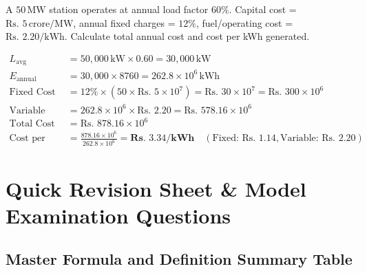 \documentclass[11pt,a4paper]{article}
\newenvironment{Problem}[1][Numerical Problem]{\begin{tcolorbox}[problembox, title=#1]}{\end{tcolorbox}}
\newenvironment{Solution}[1][Step-by-Step Solution]{\begin{tcolorbox}[solbox, title=#1]}{\end{tcolorbox}}
\begin{document}
\begin{Problem}[Problem 12: Generation Tariff Economics]
A $50\,\text{MW}$ station operates at annual load factor $60\%$. Capital cost = $\text{Rs. } 5\,\text{crore/MW}$, annual fixed charges = $12\%$, fuel/operating cost = $\text{Rs. } 2.20/\text{kWh}$. Calculate total annual cost and cost per kWh generated.
\end{Problem}

\begin{Solution}
\begin{align*}
  L_{\text{avg}} &= 50,000\,\text{kW} \times 0.60 = 30,000\,\text{kW} \\
  E_{\text{annual}} &= 30,000 \times 8760 = 262.8 \times 10^6\,\text{kWh} \\
  \text{Fixed Cost} &= 12\% \times (50 \times \text{Rs. } 5 \times 10^7) = \text{Rs. } 30 \times 10^7 = \text{Rs. } 300 \times 10^6 \\
  \text{Variable Cost} &= 262.8 \times 10^6 \times \text{Rs. } 2.20 = \text{Rs. } 578.16 \times 10^6 \\
  \text{Total Cost} &= \text{Rs. } 878.16 \times 10^6 \\
  \text{Cost per kWh} &= \frac{878.16 \times 10^6}{262.8 \times 10^6} = \mathbf{\text{Rs. } 3.34/\text{kWh}} \quad (\text{Fixed: Rs. 1.14}, \text{Variable: Rs. 2.20})
\end{align*}
\end{Solution}

\clearpage
\section{Quick Revision Sheet \& Model Examination Questions}

\subsection{Master Formula and Definition Summary Table}
\end{document}
